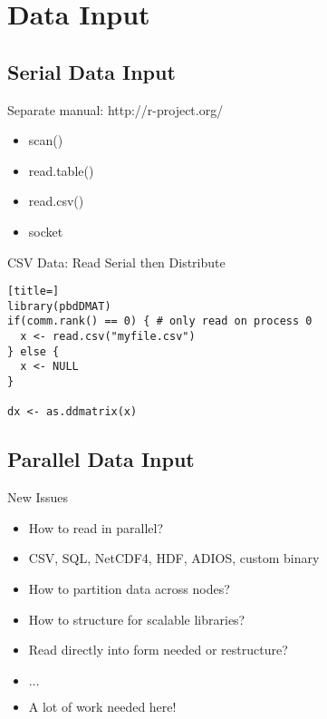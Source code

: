 \section[Input]{Data Input}
\makesubcontentsslides

\subsection{Serial Data Input}

\begin{frame}
\begin{block}{Separate manual: http://r-project.org/}
\begin{itemize}
\item scan()
\item read.table()
\item read.csv()
\item socket
\end{itemize}
\end{block}
\end{frame}

\begin{frame}
  \begin{exampleblock}{CSV Data: Read Serial then Distribute}\pause
\begin{lstlisting}[title=]
library(pbdDMAT)
if(comm.rank() == 0) { # only read on process 0
  x <- read.csv("myfile.csv")
} else {
  x <- NULL
}

dx <- as.ddmatrix(x)
\end{lstlisting}
  \end{exampleblock}
\end{frame}


\subsection{Parallel Data Input}

\begin{frame}
  \begin{block}{New Issues}\pause
    \begin{itemize}
    \item How to read in parallel?
    \item CSV, SQL, NetCDF4, HDF, ADIOS, custom binary
    \item How to partition data across nodes?
    \item How to structure for scalable libraries?
    \item Read directly into form needed or restructure?
    \item $\ldots$
    \item A lot of work needed here!
    \end{itemize}
  \end{block}
\end{frame}

